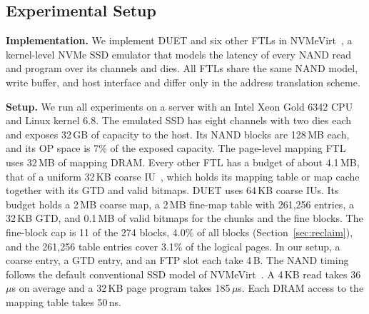\subsection{Experimental Setup}
\textbf{Implementation.} We implement DUET and six other FTLs in NVMeVirt~\cite{nvmevirt}, a kernel-level
NVMe SSD emulator that models the latency of every NAND read and program
over its channels and dies. All FTLs share
the same NAND model, write buffer, and host interface and differ only in the address translation scheme.

\textbf{Setup.} We run all experiments on a server with an Intel Xeon Gold 6342 CPU
and Linux kernel 6.8. The emulated SSD has eight channels with two dies each and
exposes 32\,GB of capacity to the host. Its NAND blocks are 128\,MB each, and its OP space is 7\% of the exposed capacity. The page-level mapping FTL uses 32\,MB of mapping DRAM. Every other FTL has a budget of about 4.1\,MB,
that of a uniform 32\,KB coarse IU~\cite{micron-iu}, which holds its mapping table
or map cache together with its GTD and valid bitmaps. DUET uses 64\,KB coarse IUs. Its budget holds a 2\,MB coarse map, a 2\,MB
fine-map table with 261,256 entries, a 32\,KB GTD, and 0.1\,MB of valid bitmaps for
the chunks and the fine blocks. The fine-block cap is 11 of the 274 blocks, 4.0\% of all blocks (Section~\ref{sec:reclaim}),
and the 261,256 table entries cover 3.1\% of the logical pages. In our setup, a coarse entry, a GTD entry, and an FTP slot each take 4\,B. The NAND timing follows the default conventional SSD model
of NVMeVirt~\cite{nvmevirt}. A 4\,KB read takes 36\,$\mu$s on average and a 32\,KB page program
takes 185\,$\mu$s. Each DRAM access to the mapping table takes 50\,ns.

